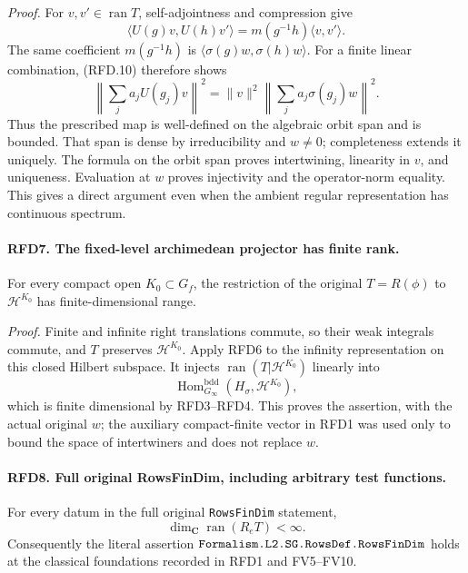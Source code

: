 \documentclass[11pt,a4paper]{article}
\numberwithin{equation}{section}
\theoremstyle{remark}\newtheorem{remark}[theorem]{Remark}
\begin{document}
\emph{Proof.}
For \(v,v'\in\operatorname{ran}T\), self-adjointness and
compression give
\[
 \langle U(g)v,U(h)v'\rangle
   =m(g^{-1}h)\langle v,v'\rangle.
 \tag{RFD.10}
\]
The same coefficient \(m(g^{-1}h)\) is
\(\langle\sigma(g)w,\sigma(h)w\rangle\).
For a finite linear combination, (RFD.10) therefore shows
\[
 \left\|\sum_j a_jU(g_j)v\right\|^2
 =\|v\|^2\left\|\sum_j a_j\sigma(g_j)w\right\|^2.
 \tag{RFD.11}
\]
Thus the prescribed map is well-defined on the algebraic orbit
span and is bounded.  That span is dense by irreducibility and
\(w\ne0\); completeness extends it uniquely.  The formula on
the orbit span proves intertwining, linearity in \(v\), and
uniqueness.  Evaluation at \(w\) proves injectivity and the
operator-norm equality.  This gives a direct argument even when
the ambient regular representation has continuous spectrum.

\paragraph{RFD7. The fixed-level archimedean projector has finite rank.}
\label{claim:RFD7}
For every compact open \(K_0\subset G_f\), the restriction of the
original \(T=R(\phi)\) to \(\mathcal H^{K_0}\) has finite-dimensional
range.

\emph{Proof.}
Finite and infinite right translations commute, so their weak
integrals commute, and \(T\) preserves \(\mathcal H^{K_0}\).
Apply RFD6 to the infinity representation on this closed Hilbert
subspace.  It injects \(\operatorname{ran}(T|\mathcal H^{K_0})\)
linearly into
\[
 \operatorname{Hom}^{\mathrm{bdd}}_{G_\infty}
       (H_\sigma,\mathcal H^{K_0}),
\]
which is finite dimensional by RFD3--RFD4.  This proves the
assertion, with the actual original \(w\); the auxiliary
compact-finite vector in RFD1 was used only to bound the space
of intertwiners and does not replace \(w\).

\paragraph{RFD8. Full original RowsFinDim, including arbitrary test functions.}
\label{claim:RFD8}
For every datum in the full original \texttt{Rows\allowbreak Fin\allowbreak Dim} statement,
\[
 \dim_{\mathbf C}\operatorname{ran}(R_eT)<\infty.
 \tag{RFD.12}
\]
Consequently the literal assertion
\(\texttt{Formalism.\allowbreak L2.\allowbreak SG.\allowbreak Rows\allowbreak Def.\allowbreak Rows\allowbreak Fin\allowbreak Dim}\) holds at the
classical foundations recorded in RFD1 and FV5--FV10.
\end{document}
